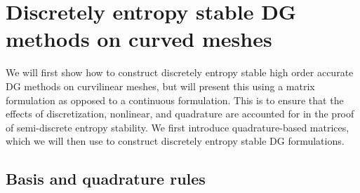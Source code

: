 \documentclass[preprint,10pt]{article}
\theoremstyle{definition}
\theoremstyle{lemma}
\theoremstyle{theorem}
\theoremstyle{assumption}
\begin{document}
\section{Discretely entropy stable DG methods on curved meshes}

We will first show how to construct discretely entropy stable high order accurate DG methods on curvilinear meshes, but will present this using a matrix formulation as opposed to a continuous formulation.  This is to ensure that the effects of discretization, nonlinear, and quadrature are accounted for in the proof of semi-discrete entropy stability.  We first introduce quadrature-based matrices, which we will then use to construct discretely entropy stable DG formulations.


\subsection{Basis and quadrature rules}
\end{document}
